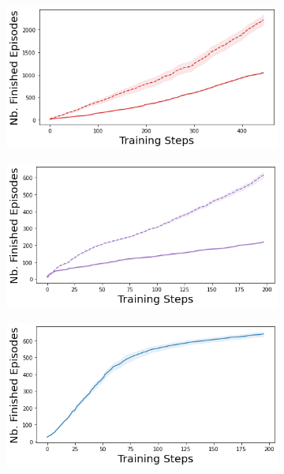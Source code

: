 \begin{figure}
    \begin{subfigure}{.24\textwidth}
        \includegraphics[width=\textwidth]{sections/011_icml2022/resources/lunarlander-n_finished_training_episodes-dropout-training-strategy.png}
    \end{subfigure}
    \begin{subfigure}{.24\textwidth}
        \includegraphics[width=\textwidth]{sections/011_icml2022/resources/lunarlander-n_finished_training_episodes-ensemble-training-strategy.png}
    \end{subfigure}
    \begin{subfigure}{.24\textwidth}
        \includegraphics[width=\textwidth]{sections/011_icml2022/resources/lunarlander-n_finished_training_episodes-dkl-training-strategy.png}

\end{subfigure}
\end{figure}
